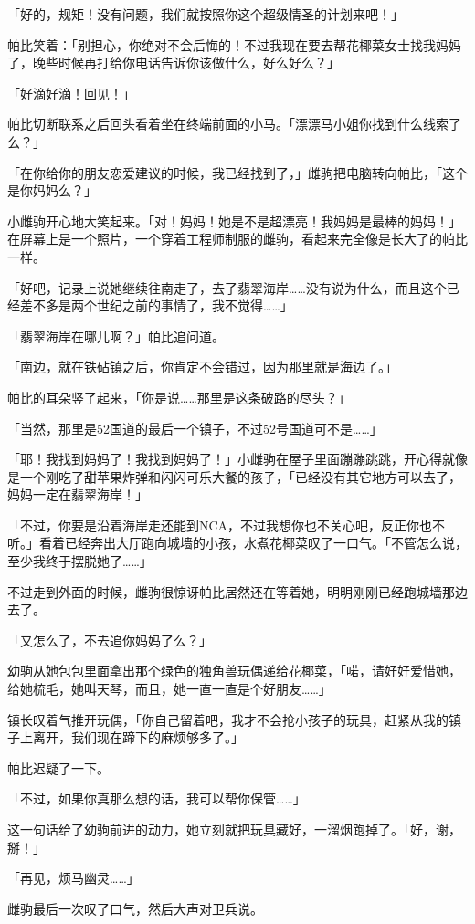 「好的，规矩！没有问题，我们就按照你这个超级情圣的计划来吧！」

帕比笑着：「别担心，你绝对不会后悔的！不过我现在要去帮花椰菜女士找我妈妈了，晚些时候再打给你电话告诉你该做什么，好么好么？」

「好滴好滴！回见！」

帕比切断联系之后回头看着坐在终端前面的小马。「漂漂马小姐你找到什么线索了么？」

「在你给你的朋友恋爱建议的时候，我已经找到了，」雌驹把电脑转向帕比，「这个是你妈妈么？」

小雌驹开心地大笑起来。「对！妈妈！她是不是超漂亮！我妈妈是最棒的妈妈！」在屏幕上是一个照片，一个穿着工程师制服的雌驹，看起来完全像是长大了的帕比一样。

「好吧，记录上说她继续往南走了，去了翡翠海岸……没有说为什么，而且这个已经差不多是两个世纪之前的事情了，我不觉得……」

「翡翠海岸在哪儿啊？」帕比追问道。

「南边，就在铁砧镇之后，你肯定不会错过，因为那里就是海边了。」

帕比的耳朵竖了起来，「你是说……那里是这条破路的尽头？」

「当然，那里是52国道的最后一个镇子，不过52号国道可不是……」

「耶！我找到妈妈了！我找到妈妈了！」小雌驹在屋子里面蹦蹦跳跳，开心得就像是一个刚吃了甜苹果炸弹和闪闪可乐大餐的孩子，「已经没有其它地方可以去了，妈妈一定在翡翠海岸！」

「不过，你要是沿着海岸走还能到NCA，不过我想你也不关心吧，反正你也不听。」看着已经奔出大厅跑向城墙的小孩，水煮花椰菜叹了一口气。「不管怎么说，至少我终于摆脱她了……」

不过走到外面的时候，雌驹很惊讶帕比居然还在等着她，明明刚刚已经跑城墙那边去了。

「又怎么了，不去追你妈妈了么？」

幼驹从她包包里面拿出那个绿色的独角兽玩偶递给花椰菜，「喏，请好好爱惜她，给她梳毛，她叫天琴，而且，她一直一直是个好朋友……」

镇长叹着气推开玩偶，「你自己留着吧，我才不会抢小孩子的玩具，赶紧从我的镇子上离开，我们现在蹄下的麻烦够多了。」

帕比迟疑了一下。

「不过，如果你真那么想的话，我可以帮你保管……」

这一句话给了幼驹前进的动力，她立刻就把玩具藏好，一溜烟跑掉了。「好，谢，掰！」

「再见，烦马幽灵……」

雌驹最后一次叹了口气，然后大声对卫兵说。

